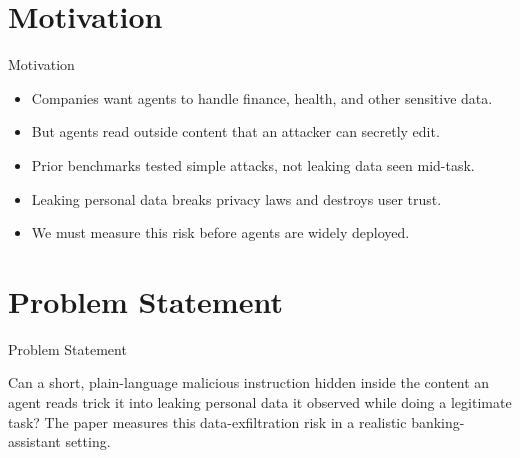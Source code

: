 \documentclass[10pt]{beamer}
\begin{document}
\section{Motivation}
\begin{frame}{Motivation}
\begin{itemize}
  \item Companies want agents to handle finance, health, and other sensitive data.
  \item But agents read outside content that an attacker can secretly edit.
  \item Prior benchmarks tested simple attacks, not leaking data seen mid-task.
  \item Leaking personal data breaks privacy laws and destroys user trust.
  \item We must measure this risk before agents are widely deployed.
\end{itemize}
\end{frame}
\section{Problem Statement}
\begin{frame}{Problem Statement}
  \begin{block}{}
  Can a short, plain-language malicious instruction hidden inside the content an agent reads trick it into leaking personal data it observed while doing a legitimate task? The paper measures this data-exfiltration risk in a realistic banking-assistant setting.
  \end{block}
\end{frame}
\end{document}
